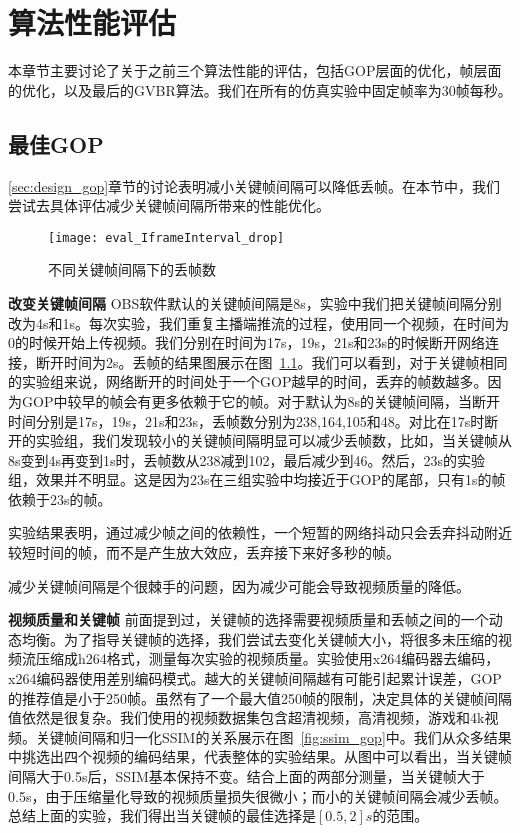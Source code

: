 \chapter{算法性能评估}
本章节主要讨论了关于之前三个算法性能的评估，包括GOP层面的优化，帧层面的优化，以及最后的GVBR算法。我们在所有的仿真实验中固定帧率为30帧每秒。

\section{最佳GOP}
\ref{sec:design_gop}章节的讨论表明减小关键帧间隔可以降低丢帧。在本节中，我们尝试去具体评估减少关键帧间隔所带来的性能优化。

\begin{figure}[H]%
  \centering
  \texttt{[image: eval\_IframeInterval\_drop]}
  \caption{不同关键帧间隔下的丢帧数}
  \label{fig:keyframe_drop}
\end{figure}

\textbf{改变关键帧间隔} OBS软件默认的关键帧间隔是8s，实验中我们把关键帧间隔分别改为4s和1s。每次实验，我们重复主播端推流的过程，使用同一个视频，在时间为0的时候开始上传视频。我们分别在时间为17s，19s，21s和23s的时候断开网络连接，断开时间为2s。丢帧的结果图展示在图~\ref{fig:keyframe_drop}。我们可以看到，对于关键帧相同的实验组来说，网络断开的时间处于一个GOP越早的时间，丢弃的帧数越多。因为GOP中较早的帧会有更多依赖于它的帧。对于默认为8s的关键帧间隔，当断开时间分别是17s，19s，21s和23s，丢帧数分别为238,164,105和48。对比在17s时断开的实验组，我们发现较小的关键帧间隔明显可以减少丢帧数，比如，当关键帧从8s变到4s再变到1s时，丢帧数从238减到102，最后减少到46。然后，23s的实验组，效果并不明显。这是因为23s在三组实验中均接近于GOP的尾部，只有1s的帧依赖于23s的帧。

实验结果表明，通过减少帧之间的依赖性，一个短暂的网络抖动只会丢弃抖动附近较短时间的帧，而不是产生放大效应，丢弃接下来好多秒的帧。

减少关键帧间隔是个很棘手的问题，因为减少可能会导致视频质量的降低。

\textbf{视频质量和关键帧} 前面提到过，关键帧的选择需要视频质量和丢帧之间的一个动态均衡。为了指导关键帧的选择，我们尝试去变化关键帧大小，将很多未压缩的视频流压缩成h264格式，测量每次实验的视频质量。实验使用x264编码器去编码，x264编码器使用差别编码模式。越大的关键帧间隔越有可能引起累计误差，GOP的推荐值是小于250帧。虽然有了一个最大值250帧的限制，决定具体的关键帧间隔值依然是很复杂。我们使用的视频数据集包含超清视频，高清视频，游戏和4k视频。关键帧间隔和归一化SSIM的关系展示在图~\ref{fig:ssim_gop}中。我们从众多结果中挑选出四个视频的编码结果，代表整体的实验结果。从图中可以看出，当关键帧间隔大于0.5s后，SSIM基本保持不变。结合上面的两部分测量，当关键帧大于0.5s，由于压缩量化导致的视频质量损失很微小；而小的关键帧间隔会减少丢帧。总结上面的实验，我们得出当关键帧的最佳选择是$[0.5,2]s$的范围。

